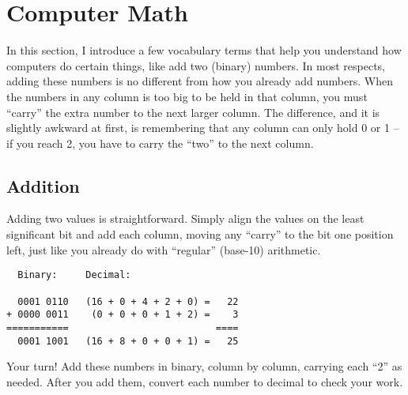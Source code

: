 \section{Computer Math}

In this section, I introduce a few vocabulary terms that help you understand how computers do certain things, like add two (binary) numbers. In most respects, adding these numbers is no different from how you already add numbers. When the numbers in any column is too big to be held in that column, you must ``carry'' the extra number to the next larger column. The difference, and it is slightly awkward at first, is remembering that any column can only hold 0 or 1 -- if you reach 2, you have to carry the ``two'' to the next column.

\subsection*{Addition}

Adding two values is straightforward. Simply align the values on the least significant bit and add each column, moving any ``carry'' to the bit one position left, just like you already do with ``regular'' (base-10) arithmetic.

\begin{verbatim}
  Binary:     Decimal:

  0001 0110   (16 + 0 + 4 + 2 + 0) =   22
+ 0000 0011    (0 + 0 + 0 + 1 + 2) =    3
===========                          ====
  0001 1001   (16 + 8 + 0 + 0 + 1) =   25
\end{verbatim}


\bigskip

\noindent Your turn! Add these numbers in binary, column by column, carrying each ``2'' as needed. After you add them, convert each number to decimal to check your work.

\bigskip

